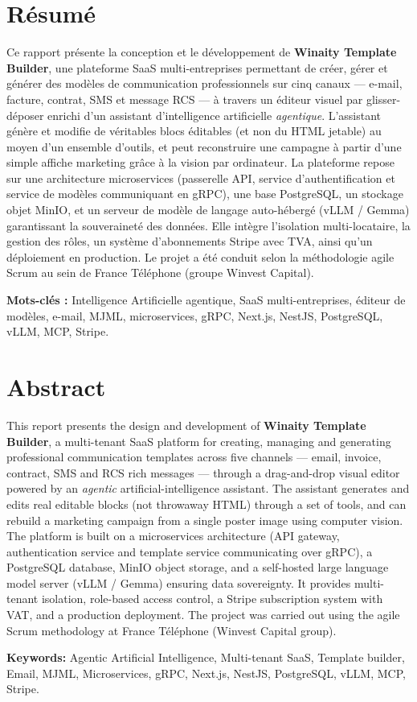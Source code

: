 \cleardoublepage
\thispagestyle{empty}

\section*{Résumé}
Ce rapport présente la conception et le développement de
\textbf{Winaity Template Builder}, une plateforme SaaS multi-entreprises
permettant de créer, gérer et générer des modèles de communication
professionnels sur cinq canaux — e-mail, facture, contrat, SMS et message
RCS — à travers un éditeur visuel par glisser-déposer enrichi d'un
assistant d'intelligence artificielle \emph{agentique}. L'assistant génère
et modifie de véritables blocs éditables (et non du HTML jetable) au moyen
d'un ensemble d'outils, et peut reconstruire une campagne à partir d'une
simple affiche marketing grâce à la vision par ordinateur. La plateforme
repose sur une architecture microservices (passerelle API, service
d'authentification et service de modèles communiquant en gRPC), une base
PostgreSQL, un stockage objet MinIO, et un serveur de modèle de langage
auto-hébergé (vLLM / Gemma) garantissant la souveraineté des données. Elle
intègre l'isolation multi-locataire, la gestion des rôles, un système
d'abonnements Stripe avec TVA, ainsi qu'un déploiement en production. Le
projet a été conduit selon la méthodologie agile Scrum au sein de
France Téléphone (groupe Winvest Capital).

\smallskip
\noindent\textbf{Mots-clés :} Intelligence Artificielle agentique, SaaS
multi-entreprises, éditeur de modèles, e-mail, MJML, microservices, gRPC,
Next.js, NestJS, PostgreSQL, vLLM, MCP, Stripe.

\vspace{1cm}

\section*{Abstract}
This report presents the design and development of
\textbf{Winaity Template Builder}, a multi-tenant SaaS platform for
creating, managing and generating professional communication templates
across five channels — email, invoice, contract, SMS and RCS rich messages
— through a drag-and-drop visual editor powered by an \emph{agentic}
artificial-intelligence assistant. The assistant generates and edits real
editable blocks (not throwaway HTML) through a set of tools, and can rebuild
a marketing campaign from a single poster image using computer vision. The
platform is built on a microservices architecture (API gateway,
authentication service and template service communicating over gRPC), a
PostgreSQL database, MinIO object storage, and a self-hosted large language
model server (vLLM / Gemma) ensuring data sovereignty. It provides
multi-tenant isolation, role-based access control, a Stripe subscription
system with VAT, and a production deployment. The project was carried out
using the agile Scrum methodology at France Téléphone (Winvest Capital
group).

\smallskip
\noindent\textbf{Keywords:} Agentic Artificial Intelligence, Multi-tenant
SaaS, Template builder, Email, MJML, Microservices, gRPC, Next.js, NestJS,
PostgreSQL, vLLM, MCP, Stripe.
